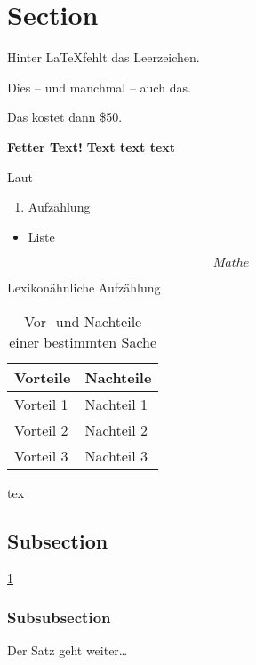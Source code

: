 
\section{Section}

Hinter \LaTeX \@ fehlt das Leerzeichen.

Dies -- und manchmal -- auch das.

Das kostet dann \$50.

\textbf{Fetter Text!}
\bfseries
Text text text
\normalfont %

Laut \cite{nguyen_machine_2018}


\begin{enumerate}
    \item Aufzählung
\end{enumerate}

\begin{itemize}
    \item Liste
\end{itemize}

\begin{equation}
    Mathe
\end{equation}

\begin{description}
    \item[Lexikonähnliche Aufzählung]
\end{description}


\begin{table}[h]
    \centering
    \begin{tabular}{|p{5cm}|p{5cm}|} 
        \hline
        \textbf{Vorteile} & \textbf{Nachteile} \\
        \hline
        Vorteil 1 & Nachteil 1 \\
        Vorteil 2 & Nachteil 2 \\
        Vorteil 3 & Nachteil 3 \\
        \hline
    \end{tabular}
    \caption{Vor- und Nachteile einer bestimmten Sache}
    \label{tab:beispiel}
\end{table}


\gls{tex}

    \subsection{Subsection}
    \lipsum[1]
    \ref{tab:beispiel}
    
        \subsubsection{Subsubsection}
        \lipsum[1] Der Satz geht weiter\dots